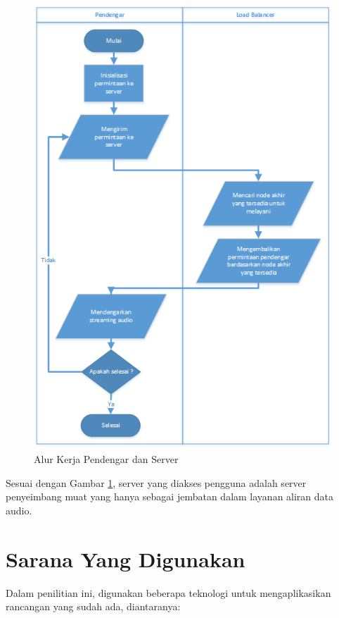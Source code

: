 \documentclass[oneside]{book}
\begin{document}
	\begin{figure}
		\centering
		\includegraphics[width=0.7\linewidth]{dengar-server}
		\caption{Alur Kerja Pendengar dan Server}
		\label{fig:dengar-server}
	\end{figure}
	
	Sesuai dengan Gambar \ref{fig:dengar-server}, server yang diakses pengguna adalah server penyeimbang muat yang hanya sebagai jembatan dalam layanan aliran data audio. 

	\section{Sarana Yang Digunakan}
	
	Dalam penilitian ini, digunakan beberapa teknologi untuk mengaplikasikan rancangan yang sudah ada, diantaranya:
	
\end{document}
